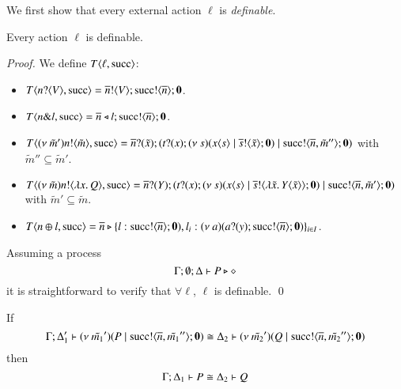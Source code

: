 We first show that every external action $\ell$ is {\em definable}.

\begin{lemma}[Definibility]
	\label{lem:definibility}
	Every action $\ell$ is definable.
\end{lemma}

\begin{proof}
	\noi We define $T\langle \ell, \textrm{succ} \rangle$:
%
	\begin{itemize}
		\item	$T\langle n ? \langle V \rangle, \textrm{succ} \rangle = \overline{n} ! \langle V \rangle ; \textrm{succ} ! \langle \overline{n} \rangle ; \mathbf{0}$.

		\item	$T\langle n \& l, \textrm{succ} \rangle = \overline{n} \triangleleft l ; \textrm{succ} ! \langle \overline{n} \rangle ; \mathbf{0}$.


		\item	$T\langle (\nu\ \tilde{m}') n ! \langle \tilde{m} \rangle, \textrm{succ} \rangle = \overline{n} ? (\tilde{x}) ; (t ? (x) ; (\nu\ s)(x\langle s \rangle \;|\; \overline{s} ! \langle \tilde{x} \rangle ; \mathbf{0}) \;|\; \textrm{succ} ! \langle \overline{n}, \tilde{m}'' \rangle ; \mathbf{0})$
			with $\tilde{m}'' \subseteq \tilde{m}'$.

		\item	$T\langle (\nu\ \tilde{m}) n ! \langle \lambda x.\,Q \rangle, \textrm{succ} \rangle = \overline{n} ? (Y) ; (t ? (x) ; (\nu\ s)(x\langle s \rangle \;|\; \overline{s} ! \langle \lambda \tilde{x}.\,Y\langle \tilde{x} \rangle \rangle ; \mathbf{0}) \;|\; \textrm{succ} ! \langle \overline{n}, \tilde{m}' \rangle ; \mathbf{0})$ with $\tilde{m}' \subseteq \tilde{m}$.

		\item	$T\langle n \oplus l, \textrm{succ} \rangle = \overline{n} \triangleright \{l: \textrm{succ} ! \langle \overline{n} \rangle ; \mathbf{0}), l_i: (\nu\ a)(a ? (y) ; \textrm{succ} ! \langle \overline{n} \rangle ; \mathbf{0})\}_{i \in I}$.
	\end{itemize}

	\noi Assuming a process 
	\[
		\Gamma; \emptyset; \Delta \vdash P \triangleright \diamond
	\] 
	\noi it is straightforward to verify that $\forall \ell$, $\ell$ is definable.
	\qed
\end{proof}

\begin{lemma}[Extrusion]\rm
	\label{lem:extrusion}
	If 
	\[
		\Gamma; \Delta_1' \vdash (\nu\ \tilde{m_1}')(P \;|\; \textrm{succ} ! \langle \overline{n}, \tilde{m_1}'' \rangle ; \mathbf{0}) \cong \Delta_2 \vdash (\nu\ \tilde{m_2}')(Q \;|\; \textrm{succ} ! \langle \overline{n}, \tilde{m_2}'' \rangle ; \mathbf{0})
	\]
	then
	\[
		\Gamma; \Delta_1 \vdash P \cong \Delta_2 \vdash Q
	\]
\end{lemma}

